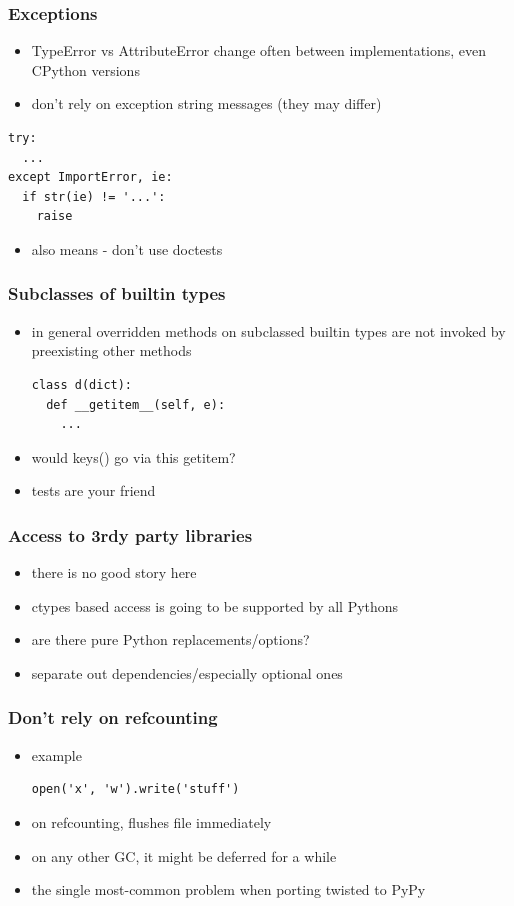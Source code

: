 \documentclass[utf8x, 14pt]{beamer}
\begin{document}
\begin{frame}[fragile]
  \frametitle{Exceptions}
  \begin{itemize}
    \item TypeError vs AttributeError change often between implementations,
      even CPython versions
    \item don't rely on exception string messages (they may differ)
  \end{itemize}
  \begin{verbatim}
try:
  ...
except ImportError, ie:
  if str(ie) != '...':
    raise
  \end{verbatim}
  \pause
  \begin{itemize}
    \item also means - don't use doctests
  \end{itemize}
\end{frame}

\begin{frame}[fragile]
  \frametitle{Subclasses of builtin types}
  \begin{itemize}
    \item in general overridden methods on subclassed builtin types are not 
      invoked by preexisting other methods
      \begin{verbatim}
class d(dict):
  def __getitem__(self, e):
    ...
      \end{verbatim}
    \item would {\ttfamily keys()} go via this getitem?
    \item tests are your friend
  \end{itemize}
\end{frame}

\begin{frame}
  \frametitle{Access to 3rdy party libraries}
  \begin{itemize}
    \item there is no good story here
    \item ctypes based access is going to be supported by all Pythons
    \item are there pure Python replacements/options?
    \item separate out dependencies/especially optional ones
  \end{itemize}
\end{frame}

\begin{frame}[fragile]
  \frametitle{Don't rely on refcounting}
  \begin{itemize}
    \item example
      \begin{verbatim}
open('x', 'w').write('stuff')
      \end{verbatim}
    \item on refcounting, flushes file immediately
    \item on any other GC, it might be deferred for
      a while
    \item the single most-common problem when porting twisted to PyPy
  \end{itemize}
\end{frame}
\end{document}
